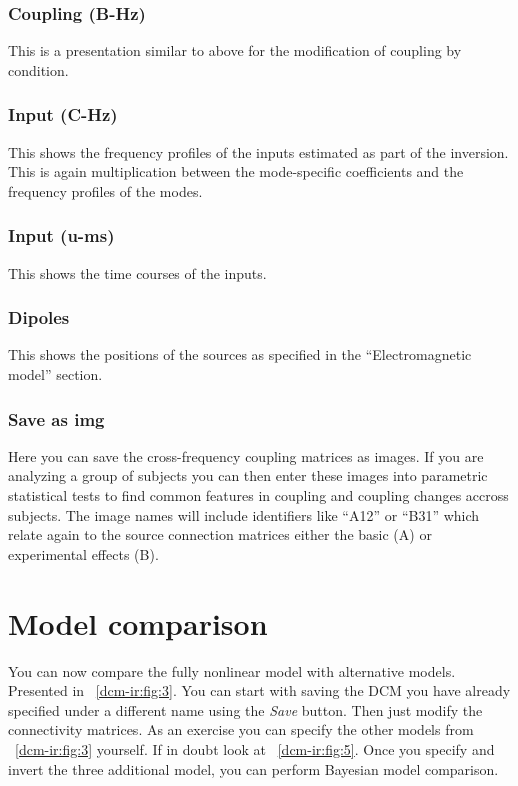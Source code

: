 \subsubsection{Coupling (B-Hz)}
This is a presentation similar to above for the modification of coupling by condition. 

\subsubsection{Input (C-Hz)}
This shows the frequency profiles of the inputs estimated as part of the inversion. This is again multiplication between the mode-specific coefficients and the frequency profiles of the modes. 

\subsubsection{Input (u-ms)}
This shows the time courses of the inputs.

\subsubsection{Dipoles}
This shows the positions of the sources as specified in the ``Electromagnetic model'' section.

\subsubsection{Save as img}
Here you can save the cross-frequency coupling matrices as images. If you are analyzing a group of subjects you can then enter these images into parametric statistical tests to find common features in coupling and coupling changes accross subjects. The image names will include identifiers like ``A12'' or ``B31'' which relate again to the source connection matrices either the basic (A) or experimental effects (B).

\section{Model comparison}

You can now compare the fully nonlinear model with alternative models. Presented in  ~\ref{dcm-ir:fig:3}. You can start with saving the DCM you have already specified under a different name using the \textit{Save} button. Then just modify the connectivity matrices. As an exercise you can specify the other models from ~\ref{dcm-ir:fig:3} yourself. If in doubt look at ~\ref{dcm-ir:fig:5}. Once you specify and invert the three additional model, you can perform Bayesian model comparison. 

